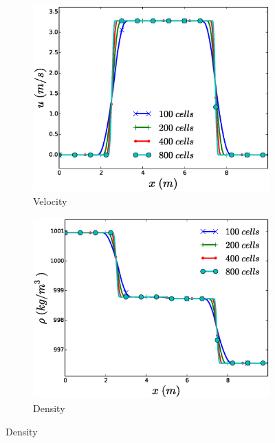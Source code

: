 \documentclass{inputs/mc2015}
\begin{document}
\begin{figure}[H]
        \centering
        \begin{subfigure}[b]{0.5\textwidth}
                \centering
                \includegraphics[width=\textwidth]{figures/liquid-mesh-sensitivity-velocity-plot.eps}
                \caption{Velocity}
                \label{fig:liquid-tube-plots-vel}
        \end{subfigure}%
        \begin{subfigure}[b]{0.5\textwidth}
                \centering
                \includegraphics[width=\textwidth]{figures/liquid-mesh-sensitivity-density-plot.eps}
                \caption{Density}
                \label{fig:liquid-tube-plots-dens}
        \end{subfigure}
        

\end{figure}
\end{document}
